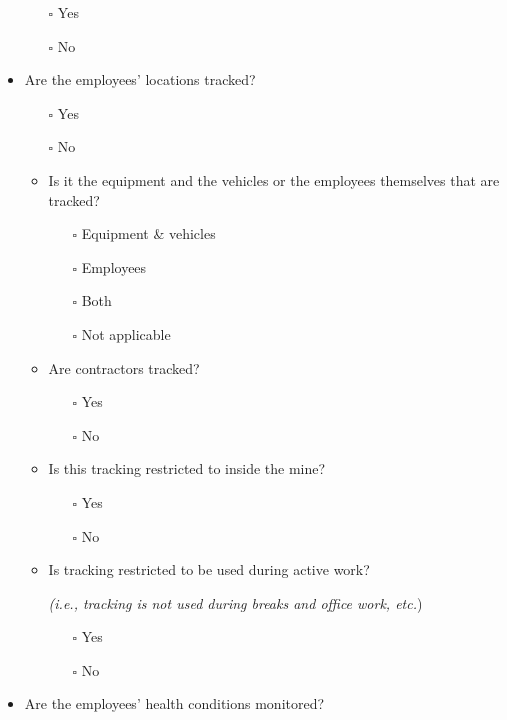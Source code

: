 \documentclass[
  12pt,
]{scrbook}
\providecommand{\tightlist}{%
  \setlength{\itemsep}{0pt}\setlength{\parskip}{0pt}}
\begin{document}
\begin{itemize}
  \begin{itemize}
  \tightlist
  \item[$\square$]
    Yes
  \item[$\square$]
    No
  \end{itemize}
\item
  Are the employees' locations tracked?

  \begin{itemize}
  \item[$\square$]
    Yes
  \item[$\square$]
    No
  \item
    Is it the equipment and the vehicles or the employees themselves that are tracked?

    \begin{itemize}
    \tightlist
    \item[$\square$]
      Equipment \& vehicles
    \item[$\square$]
      Employees
    \item[$\square$]
      Both
    \item[$\square$]
      Not applicable
    \end{itemize}
  \item
    Are contractors tracked?

    \begin{itemize}
    \tightlist
    \item[$\square$]
      Yes
    \item[$\square$]
      No
    \end{itemize}
  \item
    Is this tracking restricted to inside the mine?

    \begin{itemize}
    \tightlist
    \item[$\square$]
      Yes
    \item[$\square$]
      No
    \end{itemize}
  \item
    Is tracking restricted to be used during active work?

    \emph{(i.e., tracking is not used during breaks and office work, etc.})

    \begin{itemize}
    \tightlist
    \item[$\square$]
      Yes
    \item[$\square$]
      No
    \end{itemize}
  \end{itemize}
\item
  Are the employees' health conditions monitored?


\end{itemize}
\end{document}
